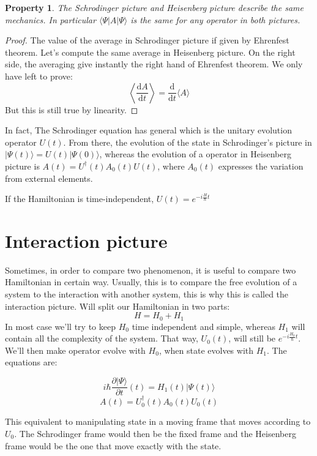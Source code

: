 \documentclass[10pt]{report}
\theoremstyle{plain}
\newtheorem{prop}[thm]{Property}
\theoremstyle{definition}
\theoremstyle{remark}
\newcommand{\ket}[1]{|#1\rangle}
\newcommand{\bra}[1]{\langle#1|}
\newcommand{\dd}{\mathrm{d}}
\newcommand{\der}[2]{\frac{\dd{#1}}{\dd{#2}}}
\begin{document}
\begin{prop}
  The Schrodinger picture and Heisenberg picture describe the same mechanics. In
  particular $\bra \Psi A \ket \Psi$ is the same for any operator in both pictures.
\end{prop}

\begin{proof}
  The value of the average in Schrodinger picture if given by Ehrenfest theorem.
  Let's compute the same average in Heisenberg picture. On the right side, the
  averaging give instantly the right hand of Ehrenfest theorem. We only have
  left to prove:
  \[ \left \langle \der A t\right\rangle = \der{}t\langle A\rangle\]
  But this is still true by linearity.
\end{proof}

In fact, The Schrodinger equation has general which is the unitary evolution
operator $U(t)$. From there, the evolution of the state in Schrodinger's picture
in $\ket {\Psi(t)} = U(t) \ket {\Psi(0)}$, whereas the evolution of a operator
in Heisenberg picture is $A(t) = U^\dagger(t)A_0(t)U(t)$, where $A_0(t)$
expresses the variation from external elements.

If the Hamiltonian is time-independent, $U(t) = e^{-i\frac H\hbar t}$

\section{Interaction picture}

Sometimes, in order to compare two phenomenon, it is useful to compare two
Hamiltonian in certain way. Usually, this is to compare the free evolution of a
system to the interaction with another system, this is why this is called the
interaction picture. Will split our Hamiltonian in two parts:
\[H = H_0 + H_1\]
In most case we'll try to keep $H_0$ time independent and simple, whereas $H_1$
will contain all the complexity of the system. That way, $U_0(t)$, will still be
$e^{-i\frac {H_0}\hbar t}$. We'll then make operator evolve with $H_0$, when
state evolves with $H_1$. The equations are:

\[i\hbar \frac{\partial \ket \Psi}{\partial t} (t) = H_1(t) \ket {\Psi(t)} \]
\[A(t) = U_0^\dagger(t)A_0(t)U_0(t)\]

This equivalent to manipulating state in a moving frame that moves according to
$U_0$. The Schrodinger frame would then be the fixed frame and the Heisenberg frame
would be the one that move exactly with the state.
\end{document}
